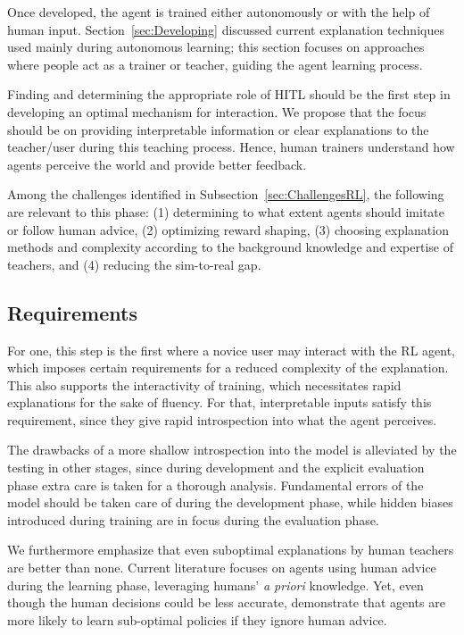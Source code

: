\documentclass[twoside,11pt]{article}
\begin{document}
\begin{enumerate}

Once developed, the agent is trained either autonomously or with the help of human input. Section~\ref{sec:Developing} discussed current explanation techniques used mainly during autonomous learning; this section focuses on approaches where people act as a trainer or teacher, guiding the agent learning process.

Finding and determining the appropriate role of HITL should be the first step in developing an optimal mechanism for interaction. We propose that the focus should be on providing interpretable information or clear explanations to the teacher/user during this teaching process. Hence, human trainers understand how agents perceive the world and provide better feedback.

Among the challenges identified in Subsection~\ref{sec:ChallengesRL}, the following are relevant to this phase: (1) determining to what extent agents should imitate or follow human advice, (2) optimizing reward shaping,  (3) choosing explanation methods and complexity according to the background knowledge and expertise of teachers, and (4) reducing the sim-to-real gap. 

\subsection{Requirements}
For one, this step is the first where a novice user may interact with the RL agent, which imposes certain requirements for a reduced complexity of the explanation. This also supports the interactivity of training, which necessitates rapid explanations for the sake of fluency. For that, interpretable inputs satisfy this requirement, since they give rapid introspection into what the agent perceives. 

The drawbacks of a more shallow introspection into the model is alleviated by the testing in other stages, since during development and the explicit evaluation phase extra care is taken for a thorough analysis. Fundamental errors of the model should be taken care of during the development phase, while hidden biases introduced during training are in focus during the evaluation phase.

We furthermore emphasize that even suboptimal explanations by human teachers are better than none. Current literature focuses on agents using human advice during the learning phase, leveraging humans' \emph{a priori} knowledge. Yet, even though the human decisions could be less accurate, \citet{Zhang:2020:human_out_loop} demonstrate that agents are more likely to learn sub-optimal policies if they ignore human advice. 


\end{enumerate}
\end{document}
